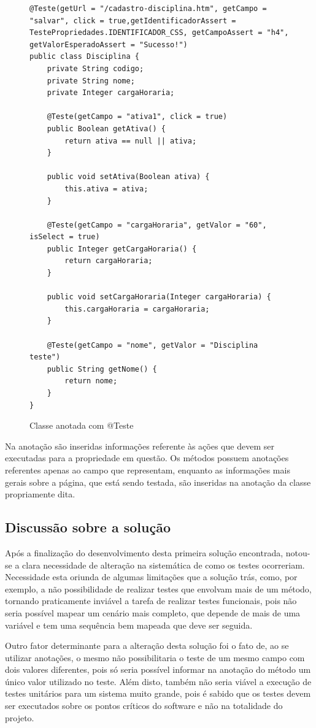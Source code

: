 \documentclass[tg]{mdtufsm}
\begin{document}
\begin{figure}[!htt]
\begin{lstlisting}
@Teste(getUrl = "/cadastro-disciplina.htm", getCampo = "salvar", click = true,getIdentificadorAssert = TestePropriedades.IDENTIFICADOR_CSS, getCampoAssert = "h4", getValorEsperadoAssert = "Sucesso!")
public class Disciplina {
    private String codigo;
    private String nome;
    private Integer cargaHoraria;

    @Teste(getCampo = "ativa1", click = true)
    public Boolean getAtiva() {
        return ativa == null || ativa;
    }

    public void setAtiva(Boolean ativa) {
        this.ativa = ativa;
    }

    @Teste(getCampo = "cargaHoraria", getValor = "60", isSelect = true)
    public Integer getCargaHoraria() {
        return cargaHoraria;
    }

    public void setCargaHoraria(Integer cargaHoraria) {
        this.cargaHoraria = cargaHoraria;
    }

    @Teste(getCampo = "nome", getValor = "Disciplina teste")
    public String getNome() {
        return nome;
    }
}
\end{lstlisting}
	\caption{Classe anotada com @Teste}
	\label{code:Disciplina.java}
\end{figure}

Na anotação são inseridas informações referente às ações que devem ser executadas para a propriedade em questão. Os métodos possuem anotações referentes apenas ao campo que representam, enquanto as informações mais gerais sobre
a página, que está sendo testada, são inseridas na anotação da classe propriamente dita.

\subsection{Discussão sobre a solução}
Após a finalização do desenvolvimento desta primeira solução encontrada, notou-se a clara necessidade de alteração na sistemática de como os testes ocorreriam. Necessidade esta oriunda de algumas limitações que a solução trás,
como, por exemplo, a não possibilidade de realizar testes que envolvam mais de um método, tornando praticamente inviável a tarefa de realizar testes funcionais, pois não seria possível mapear um cenário mais completo, que depende
de mais de uma variável e tem uma sequência bem mapeada que deve ser seguida.

Outro fator determinante para a alteração desta solução foi o fato de, ao se utilizar anotações, o mesmo não possibilitaria o teste de um mesmo campo com dois valores diferentes, pois só seria possível informar na anotação do
método um único valor utilizado no teste. Além disto, também não seria viável a execução de testes unitários para um sistema muito grande, pois é sabido que os testes devem ser executados sobre os pontos críticos do software e não na totalidade do projeto.
\end{document}
